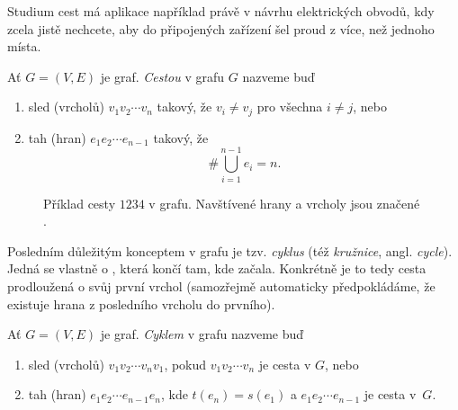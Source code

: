 Studium cest má aplikace například právě v návrhu elektrických obvodů, kdy zcela
jistě nechcete, aby do připojených zařízení šel proud z více, než jednoho místa.

\begin{definition}[Cesta]
\label{def:cesta}
 Ať $G = (V,E)$ je graf. \emph{Cestou} v grafu $G$ nazveme buď
 \begin{enumerate}
  \item sled (vrcholů) $v_1v_2 \cdots v_n$ takový, že $v_i \neq v_j$ pro všechna
   $i \neq j$, nebo
  \item tah (hran) $e_1e_2 \cdots e_{n-1}$ takový, že
   \[
    \# \bigcup_{i=1}^{n-1} e_i = n.
   \]
 \end{enumerate}
\end{definition}

\begin{figure}[h]
 \centering
 \caption{Příklad cesty $1234$ v grafu. Navštívené hrany a vrcholy jsou značené
 .}
 \label{fig:priklad-sledu}
\end{figure}

Posledním důležitým konceptem v grafu je tzv. \emph{cyklus} (též
\emph{kružnice}, angl. \emph{cycle}). Jedná se vlastně o , která
končí tam, kde začala. Konkrétně je to tedy cesta prodloužená o svůj první
vrchol (samozřejmě automaticky předpokládáme, že existuje hrana z posledního
vrcholu do prvního).

\begin{definition}[Cyklus]
\label{def:cyklus}
 Ať $G = (V,E)$ je graf. \emph{Cyklem} v grafu nazveme buď
 \begin{enumerate}
  \item sled (vrcholů) $v_1v_2  \cdots v_nv_1$, pokud $v_1v_2 \cdots v_n$ je
   cesta v $G$, nebo
  \item tah (hran) $e_1e_2 \cdots e_{n-1}e_n$, kde $t(e_n) = s(e_1)$ a $e_1e_2
   \cdots e_{n-1}$ je cesta v~$G$.
 \end{enumerate}
\end{definition}

